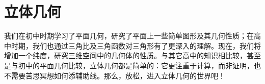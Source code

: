 \chapter{立体几何}
我们在初中时期学习了平面几何，研究了平面上一些简单图形及其几何性质；在高中时期，我们也通过三角比及三角函数对三角形有了更深入的理解。现在，我们将增加一个纬度，研究三维空间中的几何体的性质。与其它高中的知识相比较，甚至是与初中的平面几何比较，立体几何都是简单的：它更注重于计算，而非证明，也不需要苦思冥想如何添辅助线。那么，放松，进入立体几何的世界吧！
